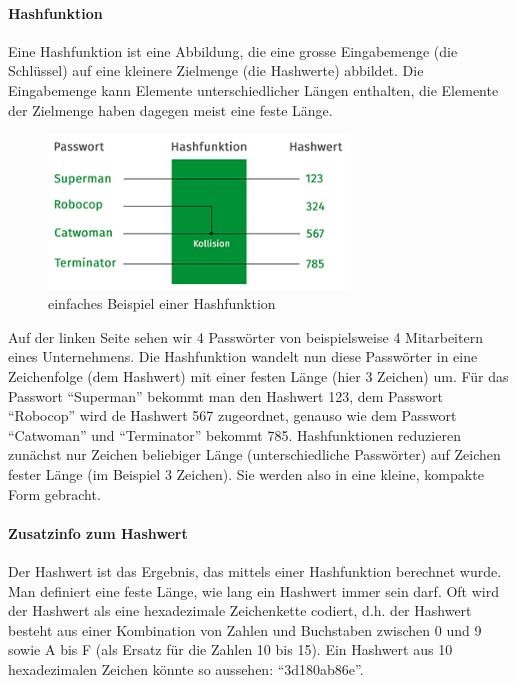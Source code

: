 \documentclass[10pt,a4paper]{article}
\begin{document}
\paragraph*{Hashfunktion}Eine Hashfunktion ist eine Abbildung, die eine grosse Eingabemenge (die Schlüssel) auf eine kleinere Zielmenge (die Hashwerte) abbildet. Die Eingabemenge kann Elemente unterschiedlicher Längen enthalten, die Elemente der Zielmenge haben dagegen meist eine feste Länge.
\begin{figure}[H]
    \begin{center}
    \includegraphics[width=8cm]{images/hash1.png}
    \caption{einfaches Beispiel einer Hashfunktion}
    \label{hash1}
    \end{center}
\end{figure}

\noindent
Auf der linken Seite sehen wir 4 Passwörter von beispielsweise 4 Mitarbeitern eines Unternehmens. Die Hashfunktion  wandelt nun diese Passwörter in eine Zeichenfolge (dem Hashwert) mit einer festen Länge (hier 3 Zeichen) um. Für das Passwort "`Superman"' bekommt man den Hashwert 123, dem Passwort "`Robocop"' wird de Hashwert 567 zugeordnet, genauso wie dem Passwort "`Catwoman"' und "`Terminator"' bekommt 785.
Hashfunktionen reduzieren zunächst nur Zeichen beliebiger Länge (unterschiedliche Passwörter) auf Zeichen fester Länge (im Beispiel 3 Zeichen). Sie werden also in eine kleine, kompakte Form gebracht.

\paragraph*{Zusatzinfo zum Hashwert}Der Hashwert ist das Ergebnis, das mittels einer Hashfunktion berechnet wurde. Man definiert eine feste Länge, wie lang ein Hashwert immer sein darf. Oft wird der Hashwert als eine hexadezimale Zeichenkette codiert, d.h. der Hashwert besteht aus einer Kombination von Zahlen und Buchstaben zwischen 0 und 9 sowie A bis F (als Ersatz für die Zahlen 10 bis 15). Ein Hashwert aus 10 hexadezimalen Zeichen könnte so aussehen: "`3d180ab86e"'.
\end{document}
